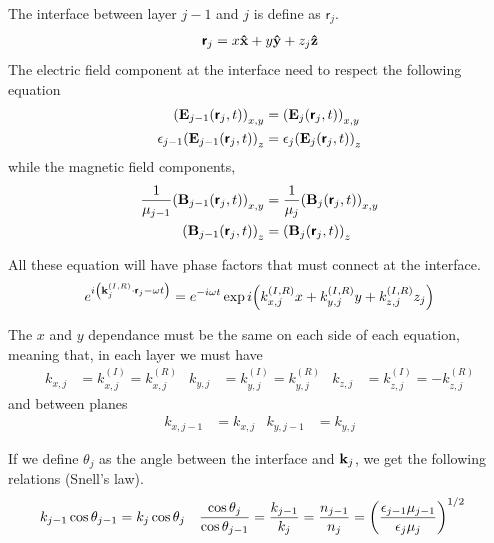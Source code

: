 The interface between layer $j-1$ and $j$ is define as $\boldsymbol{\mathsf{r}}_j$. 
\begin{align*}
	\boldsymbol{\mathsf{r}}_j = x\vu{x} + y\vu{y} + z_j\vu{z}
\end{align*}
The electric field component at the interface need to respect the following equation
\begin{align*}
	\pqty{\vb{E}_{j-1}\pqty{\boldsymbol{\mathsf{r}}_j,t}}_{x,y} &= \pqty{\vb{E}_{j}\pqty{\boldsymbol{\mathsf{r}}_j,t}}_{x,y} \\
	\epsilon_{j-1}\pqty{\vb{E}_{j-1}\pqty{\boldsymbol{\mathsf{r}}_j,t}}_z &= \epsilon_{j}\pqty{\vb{E}_{j}\pqty{\boldsymbol{\mathsf{r}}_j,t}}_z
\end{align*} while the magnetic field components,
\begin{align*}
	\frac{1}{\mu_{j-1}}\pqty{\vb{B}_{j-1}\pqty{\boldsymbol{\mathsf{r}}_j,t}}_{x,y} &= \frac{1}{\mu_j}\pqty{\vb{B}_{j}\pqty{\boldsymbol{\mathsf{r}}_j,t}}_{x,y} \\
	\pqty{\vb{B}_{j-1}\pqty{\boldsymbol{\mathsf{r}}_j,t}}_z &= \pqty{\vb{B}_{j}\pqty{\boldsymbol{\mathsf{r}}_j,t}}_z 
\end{align*}

All these equation will have phase factors that must connect at the interface. 
\begin{align*}
	e^{i\pqty{\vb{k}_j^{(I,R)}\cdot\boldsymbol{\mathsf{r}}_j - \omega t}} = e^{-i\omega t}\exp i\pqty{k^{(I,R)}_{x,j}x + k^{(I,R)}_{y,j}y + k^{(I,R)}_{z,j}z_j}
\end{align*}

The $x$ and $y$ dependance must be the same on each side of each equation, meaning that, in each layer we must have
\begin{align*}
	k_{x,j} &= k^{(I)}_{x,j} = k^{(R)}_{x,j} & k_{y,j} &= k^{(I)}_{y,j} = k^{(R)}_{y,j} & k_{z,j} &= k^{(I)}_{z,j} = -k^{(R)}_{z,j}
\end{align*} and between planes
\begin{align*}
	k_{x,j-1} &= k_{x,j} & k_{y,j-1} &= k_{y,j}
\end{align*}

If we define $\theta_j$ as the angle between the interface and $\vb{k}_j$, we get the following relations (Snell's law).
\begin{align*}
	k_{j-1}\cos\theta_{j-1} &= k_{j}\cos\theta_{j} & \frac{\cos\theta_j}{\cos\theta_{j-1}} &= \frac{k_{j-1}}{k_j} = \frac{n_{j-1}}{n_j} = \pqty{\frac{\epsilon_{j-1}\mu_{j-1}}{\epsilon_j\mu_j}}^{1/2}
\end{align*}

